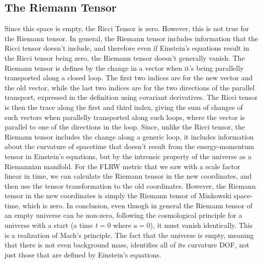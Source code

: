 \documentclass{article}
\begin{document}
\subsection{The Riemann Tensor}
Since this space is empty, the Ricci Tensor is zero. However, this is not true for the Riemann tensor. In general, the Riemann tensor includes information that the Ricci tensor doesn't include, and therefore even if Einstein's equations result in the Ricci tensor being zero, the Riemann tensor doesn't generally vanish.
\newline
The Riemann tensor is defines by the change in a vector when it's being parallelly transported along a closed loop. The first two indices are for the new vector and the old vector, while the last two indices are for the two directions of the parallel transport, expressed in the definition using covariant derivatives. The Ricci tensor is then the trace along the first and third index, giving the sum of changes of such vectors when parallelly transported along such loops, where the vector is parallel to one of the directions in the loop. Since, unlike the Ricci tensor, the Riemann tensor includes the change along a generic loop, it includes information about the curvature of spacetime that doesn't result from the energy-momentum tensor in Einstein's equations, but by the intrensic property of the universe as a Riemannian manifold.
\newline
For the FLRW metric that we saw with a scale factor linear in time, we can calculate the Riemann tensor in the new coordinates, and then use the tensor transformation to the old coordinates. However, the Riemann tensor in the new coordinates is simply the Riemann tensor of Minkowski space-time, which is zero.
\newline
In conclusion, even thuogh in general the Riemann tensor of an empty universe can be non-zero, following the cosmological principle for a universe with a start (a time $t = 0$ where $a = 0$), it must vanish identically.
\newline
This is a realization of Mach's principle. The fact that the universe is empty, meaning that there is not even background mass, identifies all of its curvature DOF, not just those that are defined by Einstein's equations.
\end{document}
